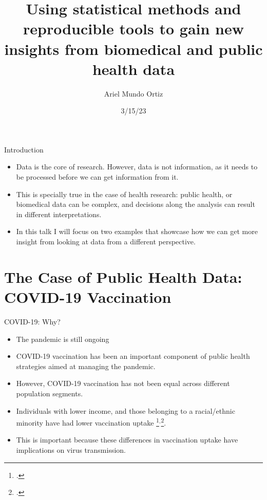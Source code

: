 \documentclass[
  ignorenonframetext,
]{beamer}
\title{Using statistical methods and reproducible tools to gain new
insights from biomedical and public health data}
\author{Ariel Mundo Ortiz}
\date{3/15/23}
\institute{Centre de Recherches Mathematiques, Université de Montréal
\newline \newline \Large \textbf{MfPH Next Generation Seminar Series}}
\begin{document}
\frame{\titlepage}
\ifdefined\Shaded\renewenvironment{Shaded}{\begin{tcolorbox}[frame hidden, sharp corners, interior hidden, enhanced, borderline west={3pt}{0pt}{shadecolor}, breakable, boxrule=0pt]}{\end{tcolorbox}}\fi

\begin{frame}{Introduction}
\protect\hypertarget{introduction}{}
\begin{itemize}[<+->]
\item
  Data is the core of research. However, data is not information, as it
  needs to be processed before we can get information from it.
\item
  This is specially true in the case of health research: public health,
  or biomedical data can be complex, and decisions along the analysis
  can result in different interpretations.
\item
  In this talk I will focus on two examples that showcase how we can get
  more insight from looking at data from a different perspective.
\end{itemize}
\end{frame}

\hypertarget{the-case-of-public-health-data-covid-19-vaccination}{%
\section{The Case of Public Health Data: COVID-19
Vaccination}\label{the-case-of-public-health-data-covid-19-vaccination}}

\begin{frame}{COVID-19: Why?}
\protect\hypertarget{covid-19-why}{}
\begin{itemize}[<+->]
\item
  The pandemic is still ongoing
\item
  COVID-19 vaccination has been an important component of public health
  strategies aimed at managing the pandemic.
\item
  However, COVID-19 vaccination has not been equal across different
  population segments.
\end{itemize}

\pause

\begin{itemize}[<+->]
\item
  Individuals with lower income, and those belonging to a racial/ethnic
  minority have had lower vaccination uptake
  \footcite{nafilyan2021}\(^{,}\)\footcite{gerretsen2021}.
\item
  This is important because these differences in vaccination uptake have
  implications on virus transmission.
\end{itemize}
\end{frame}
\end{document}
